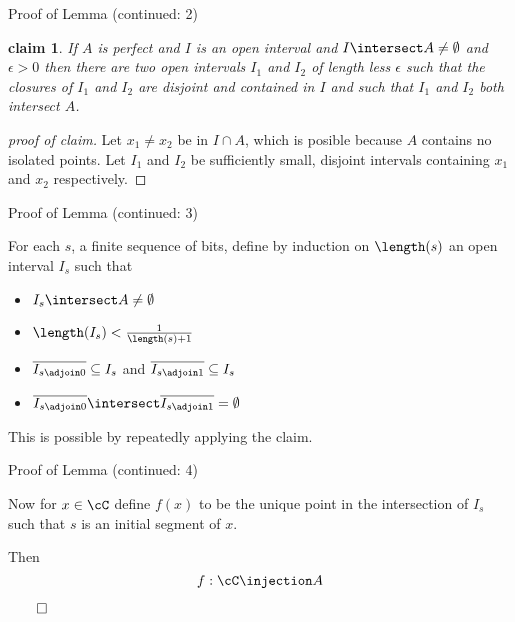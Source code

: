 \documentclass{beamer}
\newtheorem*{claim}{claim}
\newenvironment*{subproof}[1][Proof]
{\begin{proof}[#1]}{\renewcommand{\qedsymbol}{$\diamondsuit$} \end{proof}}
\begin{document}
\begin{frame}{Proof of Lemma (continued: 2)}

\begin{claim}
If $A$ is perfect and $I$ is an open interval and $I \intersect A \neq
\emptyset$ and $\epsilon > 0$ then there are two open intervals $I_1$ and
$I_2$ of length less $\epsilon$ such that the closures of $I_1$ and
$I_2$ are disjoint and contained in $I$ and such that $I_1$ and $I_2$
both intersect $A$.
\end{claim}

\begin{subproof}[proof of claim]
Let $x_1 \neq x_2$ be in $I \cap A$, which is posible because $A$
contains no isolated points. Let $I_1$ and $I_2$ be sufficiently small,
disjoint intervals containing $x_1$ and $x_2$ respectively.
\end{subproof}

\end{frame}

\begin{frame}{Proof of Lemma (continued: 3)}

For each $s$, a finite sequence of bits, define by induction on $\length(s)$
an open interval $I_s$ such that

\pause

\begin{itemize}
  \item  $I_s \intersect A \neq \emptyset$

  \item   $\length(I_s) < \frac{1}{\length(s) + 1}$

  \item  $\overline{I_{s \adjoin 0}} \subseteq I_s$ and $\overline{I_{s \adjoin 1}} \subseteq I_s$

  \item  $\overline{I_{s \adjoin 0}} \intersect \overline{I_{s \adjoin 1}} = \emptyset$

\end{itemize}

\pause

This is possible by repeatedly applying the claim.

\end{frame}

\begin{frame}{Proof of Lemma (continued: 4)}

Now for $x\in\cC$ define $f(x)$ to be the unique point in the
intersection of $I_s$ such that $s$ is an initial segment of $x$.

Then
$$f : \cC \injection A$$


$\qed$

\end{frame}
\end{document}

